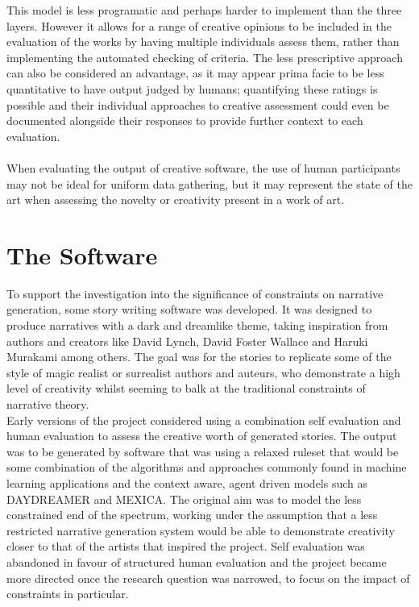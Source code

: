 \documentclass[letterpaper]{article}
\begin{document}
This model is less programatic and perhaps harder to implement than the three layers. However it allows for a range of creative opinions to be included in the evaluation of the works by having multiple individuals assess them, rather than implementing the automated checking of criteria. The less prescriptive approach can also be considered an advantage, as it may appear prima facie to be less quantitative to have output judged by humans; quantifying these ratings is possible and their individual approaches to creative assessment could even be documented alongside their responses to provide further context to each evaluation.\\
\\When evaluating the output of creative software, the use of human participants may not be ideal for uniform data gathering,  but it may represent the state of the art when assessing the novelty or creativity present in a work of art.\\

\section{The Software}
To support the investigation into the significance of constraints on narrative generation, some story writing software was developed. 
It was designed to produce narratives with a dark and dreamlike theme, taking inspiration from authors and creators like David Lynch, David Foster Wallace and Haruki Murakami among others. The goal was for the stories to replicate some of the style of magic realist or surrealist authors and auteurs, who demonstrate a high level of creativity whilst seeming to balk at the traditional constraints of narrative theory. \\

Early versions of the project considered using a combination self evaluation and human evaluation to assess the creative worth of generated stories. The output was to be generated by software that was using a relaxed ruleset that would be some combination of the algorithms and approaches commonly found in machine learning applications and the context aware, agent driven models such as DAYDREAMER and MEXICA. The original aim was to model the less constrained end of the spectrum, working under the assumption that a less restricted narrative generation system would be able to demonstrate creativity closer to that of the artists that inspired the project. Self evaluation was abandoned in favour of structured human evaluation and the project became more directed once the research question was narrowed, to focus on the impact of constraints in particular.\\
\end{document}
